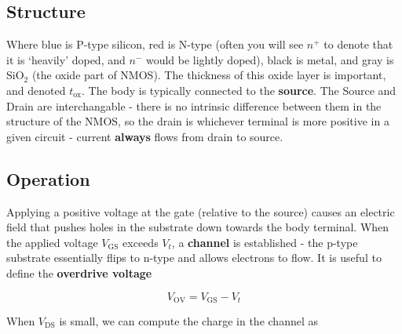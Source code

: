 \documentclass[11pt]{report}
\begin{document}
 \begin{center}
 \end{center}

 \subsection*{Structure}

 Where blue is P-type silicon, red is N-type (often you will see $n^+$ to denote that it is `heavily' doped, and $n^-$ would be lightly doped), black is metal, and gray is SiO$_2$ (the oxide part of NMOS). The thickness of this oxide layer is important, and denoted $t_{\text{ox}}$. The body is typically connected to the \textbf{source}. The Source and Drain are interchangable - there is no intrinsic difference between them in the structure of the NMOS, so the drain is whichever terminal is more positive in a given circuit - current \textbf{always} flows from drain to source.

 \subsection*{Operation}
 Applying a positive voltage at the gate (relative to the source) causes an electric field that pushes holes in the substrate down towards the body terminal. When the applied voltage $V_{\text{GS}}$ exceeds $V_t$, a \textbf{channel} is established - the p-type substrate essentially flips to n-type and allows electrons to flow. It is useful to define the \textbf{overdrive voltage}

 \begin{equation}
 	\label{eqn:overdrive-voltage}
 	V_\text{OV} = V_\text{GS} - V_t
 \end{equation}

When $V_\text{DS}$ is small, we can compute the charge in the channel as
\end{document}
